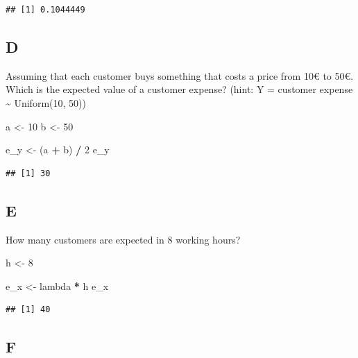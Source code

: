\documentclass[
]{article}
\newenvironment{Shaded}{\begin{snugshade}}{\end{snugshade}}
\newcommand{\DecValTok}[1]{\textcolor[rgb]{0.00,0.00,0.81}{#1}}
\newcommand{\NormalTok}[1]{#1}
\newcommand{\OperatorTok}[1]{\textcolor[rgb]{0.81,0.36,0.00}{\textbf{#1}}}
\newcommand{\StringTok}[1]{\textcolor[rgb]{0.31,0.60,0.02}{#1}}
\begin{document}
\begin{verbatim}
## [1] 0.1044449
\end{verbatim}

\hypertarget{d}{%
\subsection{D}\label{d}}

Assuming that each customer buys something that costs a price from 10€
to 50€. Which is the expected value of a customer expense? (hint: Y =
customer expense \textasciitilde{} Uniform(10, 50))

\begin{Shaded}
\begin{Highlighting}[]
\NormalTok{a \textless{}{-}}\StringTok{ }\DecValTok{10}
\NormalTok{b \textless{}{-}}\StringTok{ }\DecValTok{50}

\NormalTok{e\_y \textless{}{-}}\StringTok{ }\NormalTok{(a }\OperatorTok{+}\StringTok{ }\NormalTok{b) }\OperatorTok{/}\StringTok{ }\DecValTok{2}
\NormalTok{e\_y}
\end{Highlighting}
\end{Shaded}

\begin{verbatim}
## [1] 30
\end{verbatim}

\hypertarget{e}{%
\subsection{E}\label{e}}

How many customers are expected in 8 working hours?

\begin{Shaded}
\begin{Highlighting}[]
\NormalTok{h \textless{}{-}}\StringTok{ }\DecValTok{8}

\NormalTok{e\_x \textless{}{-}}\StringTok{ }\NormalTok{lambda }\OperatorTok{*}\StringTok{ }\NormalTok{h}
\NormalTok{e\_x}
\end{Highlighting}
\end{Shaded}

\begin{verbatim}
## [1] 40
\end{verbatim}

\hypertarget{f}{%
\subsection{F}\label{f}}
\end{document}

